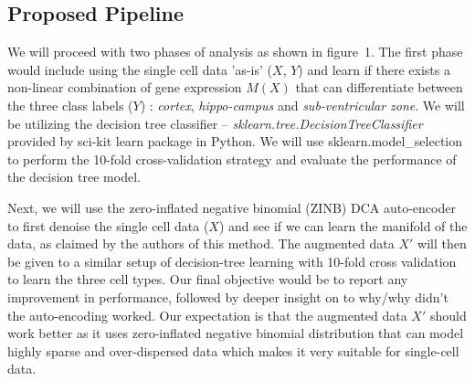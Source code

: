 \subsection*{Proposed Pipeline}
We will proceed with two phases of analysis as shown in figure~1. The first phase would include using the single cell data 'as-is' ($X$, $Y$) and learn if there exists a non-linear combination of gene expression $M(X)$ that can differentiate between the three class labels ($Y$) : \textit{cortex}, \textit{hippo-campus} and  \textit{sub-ventricular zone}. We will be utilizing the decision tree classifier -- \textit{sklearn.tree.DecisionTreeClassifier} provided by sci-kit learn package in Python. We will use sklearn.model\_selection to perform the 10-fold cross-validation strategy and evaluate the performance of the decision tree model.

Next, we will use the zero-inflated negative binomial (ZINB) DCA auto-encoder \citep{eraslan2018single} to first denoise the single cell data ($X$) and see if we can learn the manifold of the data, as claimed by the authors of this method. The augmented data $X'$ will then be given to a similar setup of decision-tree learning with 10-fold cross validation to learn the three cell types. Our final objective would be to report any improvement in performance, followed by deeper insight on to why/why didn't the auto-encoding worked. Our expectation is that the augmented data $X'$ should work better as it uses zero-inflated negative binomial distribution that can model highly sparse and over-dispersed data \citep{eraslan2018single} which makes it very suitable for single-cell data.
